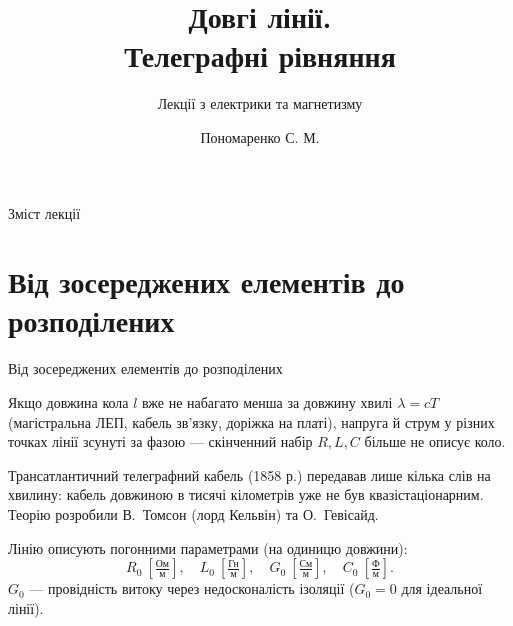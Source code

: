 \documentclass[onlytextwidth]{beamer}
\title[Лекції електрики та магнетизму]{\huge\bfseries Довгі лінії. \\ Телеграфні рівняння}
\subtitle{Лекції з електрики та магнетизму}
\author{Пономаренко С. М.}
\date{}
\begin{document}
\begin{frame}[plain]
	\maketitle
\end{frame}

\begin{frame}{Зміст лекції}{}
	\tableofcontents
\end{frame}

\section{Від зосереджених елементів до розподілених}

\begin{frame}{Від зосереджених елементів до розподілених}{}
	\begin{block}{}\justifying
		Якщо довжина кола $l$ вже не набагато менша за довжину хвилі $\lambda=cT$ (магістральна ЛЕП, кабель зв'язку, доріжка на платі), напруга й струм у різних точках лінії зсунуті за фазою --- скінченний набір $R,L,C$ більше не описує коло.
	\end{block}
	\begin{exampleblock}{}\justifying\small
		Трансатлантичний телеграфний кабель (1858 р.) передавав лише кілька слів на хвилину: кабель довжиною в тисячі кілометрів уже не був квазістаціонарним. Теорію розробили В.~Томсон (лорд Кельвін) та О.~Гевісайд.
	\end{exampleblock}
	\begin{block}{}\justifying
		Лінію описують \alert{погонними параметрами} (на одиницю довжини):
		\begin{equation*}
			R_0\ \left[\tfrac{\text{Ом}}{\text{м}}\right], \quad
			L_0\ \left[\tfrac{\text{Гн}}{\text{м}}\right], \quad
			G_0\ \left[\tfrac{\text{См}}{\text{м}}\right], \quad
			C_0\ \left[\tfrac{\text{Ф}}{\text{м}}\right].
		\end{equation*}
		$G_0$ --- провідність витоку через недосконалість ізоляції ($G_0=0$ для ідеальної лінії).
	\end{block}
\end{frame}
\end{document}
